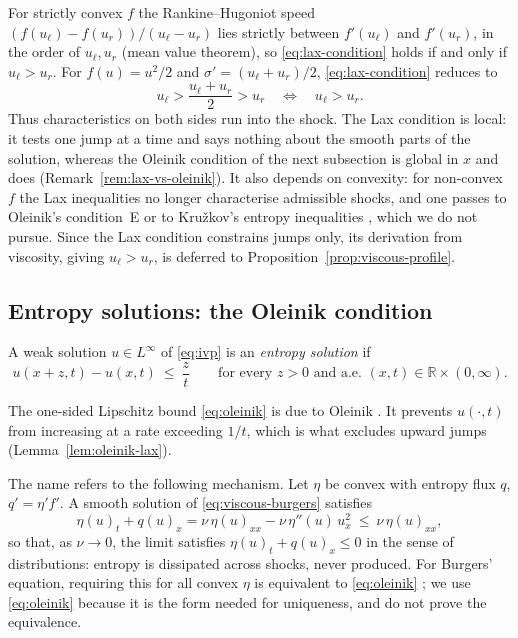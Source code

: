 For strictly convex $f$ the Rankine--Hugoniot speed $(f(u_\ell)-f(u_r))/(u_\ell-u_r)$
lies strictly between $f'(u_\ell)$ and $f'(u_r)$, in the order of $u_\ell,u_r$
(mean value theorem), so \eqref{eq:lax-condition} holds if and only if
$u_\ell>u_r$. For $f(u)=u^2/2$ and $\sigma'=(u_\ell+u_r)/2$, \eqref{eq:lax-condition} reduces to
\begin{equation}
  \label{eq:lax-burgers}
  u_\ell > \frac{u_\ell+u_r}{2} > u_r
  \quad \Longleftrightarrow \quad
  u_\ell > u_r.
\end{equation}
Thus characteristics on both sides run into the shock. The Lax condition is local:
it tests one jump at a time and says nothing about the smooth parts of the solution,
whereas the Oleinik condition of the next subsection is global in $x$ and does
(Remark~\ref{rem:lax-vs-oleinik}). It also depends on convexity: for non-convex
$f$ the Lax inequalities no longer characterise admissible shocks, and one passes to
Oleinik's condition~E or to Kru\v{z}kov's entropy inequalities
\cite{kruzhkov1970,leveque2002}, which we do not pursue. Since the Lax condition
constrains jumps only, its derivation from viscosity, giving $u_\ell>u_r$, is
deferred to Proposition~\ref{prop:viscous-profile}.

\subsection{Entropy solutions: the Oleinik condition}
\label{subsec:oleinik}

\begin{definition}
\label{def:entropy-solution}
A weak solution $u\in L^\infty$ of \eqref{eq:ivp} is an \emph{entropy
solution} if
\begin{equation}
  \label{eq:oleinik}
  u(x+z,t)-u(x,t)\ \le\ \frac{z}{t}
  \qquad\text{for every }z>0\text{ and a.e.\ }(x,t)\in\mathbb{R}\times(0,\infty).
\end{equation}
\end{definition}

The one-sided Lipschitz bound \eqref{eq:oleinik} is due to Oleinik
\cite{oleinik1957}. It prevents $u(\cdot,t)$ from increasing at a rate exceeding
$1/t$, which is what excludes upward jumps (Lemma~\ref{lem:oleinik-lax}).

\begin{remark}
\label{rem:entropy-inequality}
The name refers to the following mechanism. Let $\eta$ be convex with entropy
flux $q$, $q'=\eta'f'$. A smooth solution of \eqref{eq:viscous-burgers} satisfies
\begin{equation*}
  \eta(u)_t+q(u)_x=\nu\,\eta(u)_{xx}-\nu\,\eta''(u)\,u_x^2\ \le\ \nu\,\eta(u)_{xx},
\end{equation*}
so that, as $\nu\to0$, the limit satisfies $\eta(u)_t+q(u)_x\le0$ in the sense of
distributions: entropy is dissipated across shocks, never produced. For Burgers'
equation, requiring this for all convex $\eta$ is equivalent to
\eqref{eq:oleinik} \cite{kruzhkov1970,leveque2002}; we use \eqref{eq:oleinik}
because it is the form needed for uniqueness, and do not prove the equivalence.
\end{remark}

